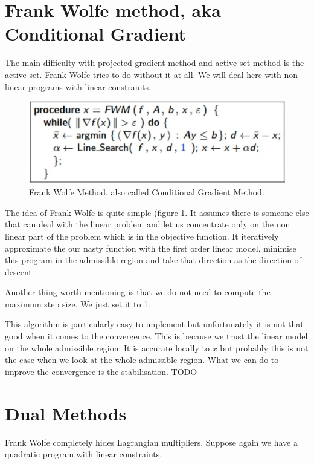 \section{Frank Wolfe method, aka Conditional Gradient}
\par The main difficulty with projected gradient method and active set method is the active set. Frank Wolfe tries to do without it at all. We will deal here with non linear programs with linear constraints. 
\begin{figure}
    \centering
    \includegraphics[scale=0.5]{figures/3/chapter3-fwm.png}
    \caption{Frank Wolfe Method, also called Conditional Gradient Method.}
    \label{fig:chapter3-fwm}
\end{figure}
\par The idea of Frank Wolfe is quite simple (figure \ref{fig:chapter3-fwm}. It assumes there is someone else that can deal with the linear problem and let us concentrate only on the non linear part of the problem which is in the objective function. It iteratively approximate the our nasty function with the first order linear model, minimise this program in the admissible region and take that direction as the direction of descent.
\par Another thing worth mentioning is that we do not need to compute the maximum step size. We just set it to 1.
\par This algorithm is particularly easy to implement but unfortunately it is not that good when it comes to the convergence. This is because we trust the linear model on the whole admissible region. It is accurate locally to $x$ but probably this is not the case when we look at the whole admissible region. What we can do to improve the convergence is the stabilisation.
TODO
%
%
%
\section{Dual Methods}
\par Frank Wolfe completely hides Lagrangian multipliers. Suppose again we have a quadratic program with linear constraints.